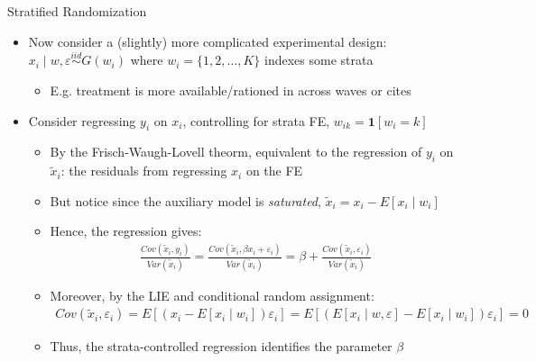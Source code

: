 \documentclass[11pt,english]{beamer}
\begin{document}
\begin{frame}{Stratified Randomization}
\begin{itemize}
\item Now consider a (slightly) more complicated experimental design: $x_i\mid w, \varepsilon \stackrel{iid}{\sim} G(w_i)$ where $w_i=\{1,2,\dots,K\}$ indexes some strata\smallskip\pause{}
\begin{itemize}
\item E.g. treatment is more available/rationed in across waves or cites\pause{}
\end{itemize}\medskip
\item Consider regressing $y_i$ on $x_i$, controlling for strata FE, $w_{ik}=\mathbf{1}[w_i=k]$\smallskip\pause{}
\begin{itemize}
\item By the Frisch-Waugh-Lovell theorm, equivalent to the regression of $y_i$ on $\tilde{x}_i$: the residuals from regressing $x_i$ on the FE\smallskip\pause{}
\item But notice since the auxiliary model is \emph{saturated}, $\tilde{x}_i=x_i-E[x_i\mid w_i]$\smallskip\pause{}
\item Hence, the regression gives:\vspace{-0.1cm}
\begin{align*}
\frac{Cov(\tilde{x}_i,y_i)}{Var(\tilde{x}_i)}=\frac{Cov(\tilde{x}_i,\beta x_i+\varepsilon_i)}{Var(\tilde{x}_i)}=\beta +\frac{Cov(\tilde{x}_i,\varepsilon_i)}{Var(\tilde{x}_i)}
\end{align*}\pause{}
\item Moreover, by the LIE and conditional random assignment:
\begin{align*}
Cov(\tilde{x}_i,\varepsilon_i)=E[(x_i-E[x_i\mid w_i])\varepsilon_i]=E[(E[x_i\mid w,\varepsilon]-E[x_i\mid w_i])\varepsilon_i]=0
\end{align*}\vspace{-0.5cm}\pause{}
\item Thus, the strata-controlled regression identifies the parameter $\beta$
\end{itemize}
\end{itemize}
\end{frame}
\end{document}
